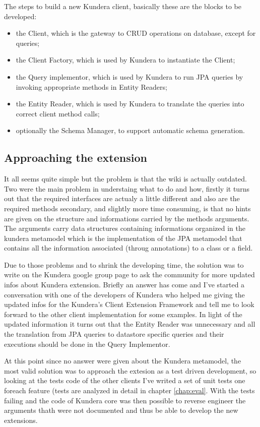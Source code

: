 The steps to build a new Kundera client, basically these are the blocks to be developed:
\begin{itemize}
\item the Client, which is the gateway to CRUD operations on database, except for queries;
\item the Client Factory, which is used by Kundera to instantiate the Client;
\item the Query implementor, which is used by Kundera to run JPA queries by invoking appropriate methods in Entity Readers;
\item the Entity Reader, which is used by Kundera to translate the queries into correct client
method calls;
\item optionally the Schema Manager, to support automatic schema generation.
\end{itemize}

\subsection{Approaching the extension}
It all seems quite simple but the problem is that the wiki is actually outdated. 
Two were the main problem in understaing what to do and how, firstly it turns out that the required interfaces are actualy a little different and also are the required methods
secondary, and slightly more time consuming, is that no hints are given on the structure and informations carried by the methods arguments.
The arguments carry data structures containing informations organized in the kundera metamodel which is the implementation of the JPA metamodel that contains all the information associated (throug annotations) to a class or a field.

Due to those problems and to shrink the developing time, the solution was to write on the Kundera google group page to ask the community for more updated infos about Kundera extension.
Briefly an answer has come and I've started a conversation with one of the developers of Kundera who helped me giving the updated infos for the Kundera's Client Extension Framework and tell me to look forward to the other client implementation for some examples. 
In light of the updated information it turns out that the Entity Reader was unnecessary and all the translation from JPA queries to datastore specific queries and their executions should be done in the Query Implementor.  

At this point since no answer were given about the Kundera metamodel, the most valid solution was to approach the extesion as a test driven development, so looking at the tests code of the other clients I've writed a set of unit tests one foreach feature (tests are analyzed in detail in chapter \ref{chap:eval}.
With the tests failing and the code of Kundera core was then possible to reverse engineer the arguments thath were not documented and thus be able to develop the new extensions.

